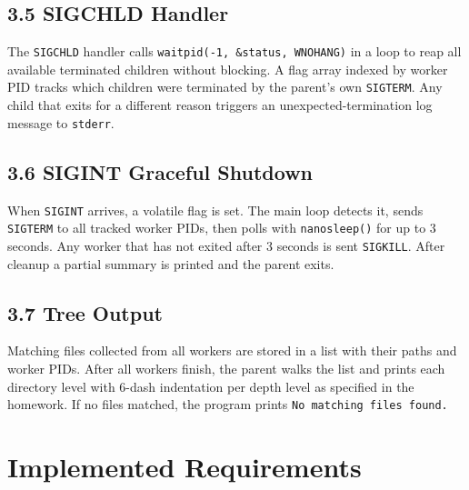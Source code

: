 \documentclass[12pt, a4paper]{article}
\begin{document}
\subsection{3.5 SIGCHLD Handler}

The \texttt{SIGCHLD} handler calls \texttt{waitpid(-1, \&status, WNOHANG)} in a loop to reap all available terminated children without blocking. A flag array indexed by worker PID tracks which children were terminated by the parent's own \texttt{SIGTERM}. Any child that exits for a different reason triggers an unexpected-termination log message to \texttt{stderr}.

\subsection{3.6 SIGINT Graceful Shutdown}

When \texttt{SIGINT} arrives, a volatile flag is set. The main loop detects it, sends \texttt{SIGTERM} to all tracked worker PIDs, then polls with \texttt{nanosleep()} for up to 3 seconds. Any worker that has not exited after 3 seconds is sent \texttt{SIGKILL}. After cleanup a partial summary is printed and the parent exits.

\subsection{3.7 Tree Output}

Matching files collected from all workers are stored in a list with their paths and worker PIDs. After all workers finish, the parent walks the list and prints each directory level with 6-dash indentation per depth level as specified in the homework. If no files matched, the program prints \texttt{No matching files found.}

\section{Implemented Requirements}
\end{document}

